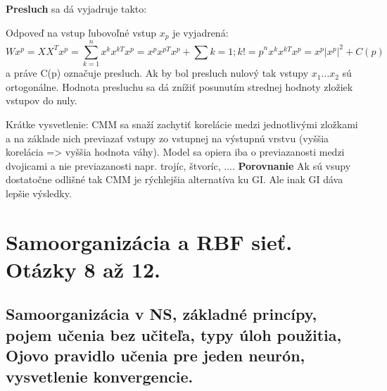 \documentclass{article}
\numberwithin{equation}{section} %
\begin{document}
\textbf{Presluch} sa dá vyjadruje takto: 

Odpoveď na vstup ľubovoľné vstup $x_p$ je vyjadrená: $$Wx^p = X X^T x^p = \sum_{k=1}^n x^k x^{kT} x^p = x^p x^{pT} x^p + \sum{k=1;k!=p}^n x^k x^{kT} x^p = x^p |x^p|^2 + C(p)$$ a práve C(p) označuje presluch. Ak by bol presluch nulový tak vstupy $x_1 \dots x_2$ sú ortogonálne. Hodnota presluchu sa dá znížiť posunutím strednej hodnoty zložiek vstupov do nuly.

Krátke vysvetlenie: CMM sa snaží zachytiť korelácie medzi jednotlivými zložkami a na základe nich previazať vstupy zo vstupnej na výstupnú vrstvu (vyššia korelácia => vyššia hodnota váhy). Model sa opiera iba o previazanosti medzi dvojicami a nie previazanosti napr. trojíc, štvoríc, .... 
\textbf{Porovnanie}
Ak sú vsupy dostatočne odlišné tak CMM je rýchlejšia alternatíva ku GI. Ale inak GI dáva lepšie výsledky. 

\section{Samoorganizácia a RBF sieť. Otázky 8 až 12.}
\subsection{Samoorganizácia v NS, základné princípy, pojem učenia bez učiteľa, typy úloh použitia, Ojovo pravidlo učenia pre jeden neurón, vysvetlenie konvergencie.}
\end{document}
